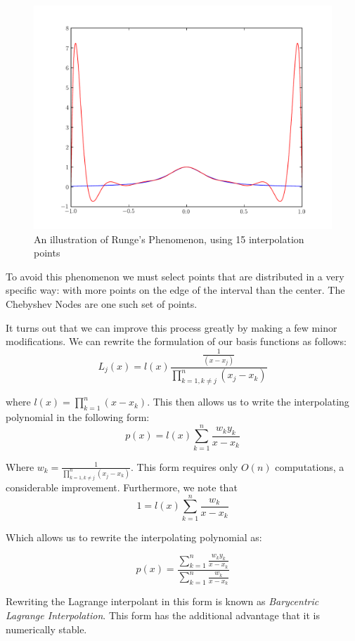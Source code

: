\begin{figure}
\begin{center}
\includegraphics[scale = .5]{Runge.pdf}
\caption{An illustration of Runge's Phenomenon, using 15 interpolation points}
\label{Fig:Runge}
\end{center}
\end{figure}


To avoid this phenomenon we must select points that are distributed in a very specific way: with more points on the edge of the interval than the center. The Chebyshev Nodes are one such set of points.

It turns out that we can improve this process greatly by making a few minor modifications. We can rewrite the formulation of our basis functions as follows:
\[
L_j(x) = l(x)\frac{\frac{1}{(x-x_j)}}{\displaystyle\prod_{k=1, k \neq j}^n (x_j-x_k)}
\]

where $l(x) = \prod_{k=1}^n (x-x_k)$. This then allows us to write the interpolating polynomial in the following form:
\[
p(x) = l(x) \sum_{k=1}^n \frac{w_k y_k}{x-x_k}
\]

Where $w_k = \frac{1}{\prod_{k=1, k \neq j}^n (x_j-x_k)}$. This form requires only $O(n)$ computations, a considerable improvement. Furthermore, we note that
\[
1 = l(x) \sum_{k=1}^n \frac{w_k}{x-x_k}
\]

Which allows us to rewrite the interpolating polynomial as:

\[
p(x) = \frac{\displaystyle\sum_{k=1}^n \frac{w_k y_k}{x-x_k}}{\displaystyle\sum_{k=1}^n \frac{w_k}{x-x_k}}
\]

Rewriting the Lagrange interpolant in this form is known as \emph{Barycentric Lagrange Interpolation}. This form has the additional advantage that it is numerically stable.

